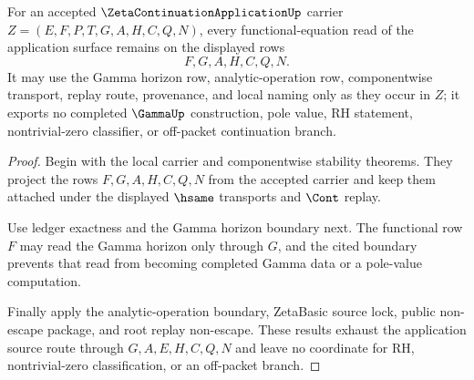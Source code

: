 \begin{theorem}
\label{thm:zeta-continuation-application-functional-row-totality}
For an accepted $\ZetaContinuationApplicationUp$ carrier
$Z=(E,F,P,T,G,A,H,C,Q,N)$, every functional-equation read of the application
surface remains on the displayed rows
$$
F,G,A,H,C,Q,N .
$$
It may use the Gamma horizon row, analytic-operation row, componentwise
transport, replay route, provenance, and local naming only as they occur in
$Z$; it exports no completed $\GammaUp$ construction, pole value, RH statement,
nontrivial-zero classifier, or off-packet continuation branch.
\end{theorem}
\begin{proof}
Begin with the local carrier and componentwise stability theorems. They project
the rows $F,G,A,H,C,Q,N$ from the accepted carrier and keep them attached under
the displayed $\hsame$ transports and $\Cont$ replay.

Use ledger exactness and the Gamma horizon boundary next. The functional row
$F$ may read the Gamma horizon only through $G$, and the cited boundary prevents
that read from becoming completed Gamma data or a pole-value computation.

Finally apply the analytic-operation boundary, ZetaBasic source lock, public
non-escape package, and root replay non-escape. These results exhaust the
application source route through $G,A,E,H,C,Q,N$ and leave no coordinate for RH,
nontrivial-zero classification, or an off-packet branch.
\end{proof}


